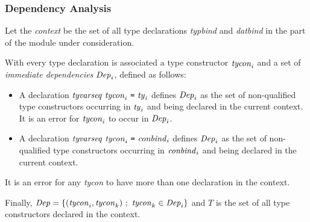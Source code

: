 \subsubsection{Dependency Analysis}
Let the \emph{context} be the set of all type declarations \emph{typbind}
and \emph{datbind} in the part of the module under consideration.

With every type declaration is associated a type constructor $\mbox{\textit{tycon}}_i$
and a set of \emph{immediate dependencies} $\mbox{\textit{Dep}}_i$, defined as follows:
\begin{itemize}
\item A declaration $\mbox{\textit{tyvarseq}}~\mbox{\textit{tycon}}_i~\mbox{\texttt{=}}~\mbox{\textit{ty}}_i$
defines $\mbox{\textit{Dep}}_i$ as the set of non-qualified type constructors
occurring in $\mbox{\textit{ty}}_i$ and being declared in the current context.
It is an error for $\mbox{\textit{tycon}}_i$ to occur in $\mbox{\textit{Dep}}_i$.

\item A declaration $\mbox{\textit{tyvarseq}}~\mbox{\textit{tycon}}_i~\mbox{\texttt{=}}~\mbox{\textit{conbind}}_i$
defines $\mbox{\textit{Dep}}_i$ as the set of non-qualified type constructors
occurring in $\mbox{\textit{conbind}}_i$ and being declared in the current context.
\end{itemize}

It is an error for any \emph{tycon} to have more than one declaration in the context.

Finally, $\mbox{\textit{Dep}}=\{(\mbox{\textit{tycon}}_i,\mbox{\textit{tycon}}_k)~;~\mbox{\textit{tycon}}_k\in\mbox{\textit{Dep}}_i\}$
and $T$ is the set of all type constructors declared in the context.

